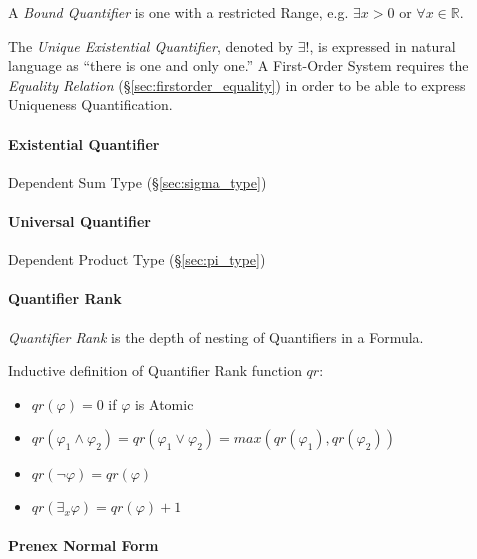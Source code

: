 A \emph{Bound Quantifier} is one with a restricted Range, e.g.
$\exists x > 0$ or $\forall x \in \mathbb{R}$.

The \emph{Unique Existential Quantifier}, denoted by $\exists !$, is
expressed in natural language as ``there is one and only one.'' A
First-Order System requires the \emph{Equality Relation}
(\S\ref{sec:firstorder_equality}) in order to be able to express
Uniqueness Quantification.



\paragraph{Existential Quantifier}\label{sec:existential_quantifier}\hfill

Dependent Sum Type (\S\ref{sec:sigma_type})



\paragraph{Universal Quantifier}\label{sec:universal_quantifier}\hfill

Dependent Product Type (\S\ref{sec:pi_type})



\paragraph{Quantifier Rank}\label{sec:quantifier_rank}\hfill

\emph{Quantifier Rank} is the depth of nesting of Quantifiers in a
Formula.

Inductive definition of Quantifier Rank function $qr$:
\begin{itemize}
  \item $qr(\varphi) = 0$ if $\varphi$ is Atomic
  \item $qr(\varphi_1 \wedge \varphi_2) =
    qr(\varphi_1 \vee \varphi_2) = max(qr(\varphi_1),qr(\varphi_2))$
  \item $qr(\neg \varphi) = qr(\varphi)$
  \item $qr(\exists_x \varphi) = qr(\varphi) + 1$
\end{itemize}



\paragraph{Prenex Normal Form}\label{sec:prenex_normal}\hfill

